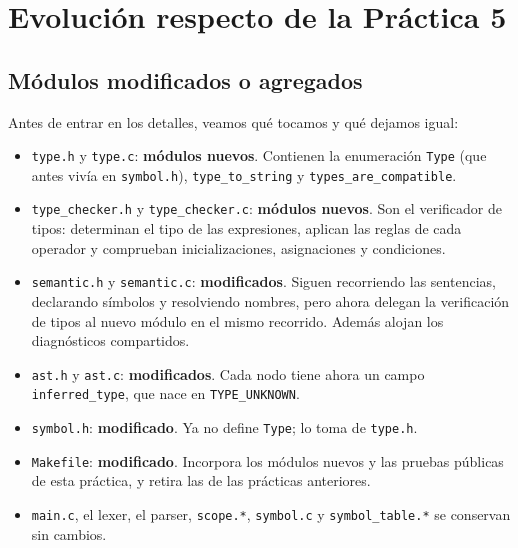 \documentclass[12pt,letterpaper]{article}
\begin{document}
\bigskip

\section*{Evolución respecto de la Práctica 5}

\subsection*{Módulos modificados o agregados}

Antes de entrar en los detalles, veamos qué tocamos y qué dejamos igual:

\begin{itemize}
\item \texttt{type.h} y \texttt{type.c}: \textbf{módulos nuevos}. Contienen la enumeración \texttt{Type} (que
  antes vivía en \texttt{symbol.h}), \texttt{type\_to\_string} y \texttt{types\_are\_compatible}.

\item \texttt{type\_checker.h} y \texttt{type\_checker.c}: \textbf{módulos nuevos}. Son el verificador de tipos:
  determinan el tipo de las expresiones, aplican las reglas de cada operador y comprueban inicializaciones,
  asignaciones y condiciones.

\item \texttt{semantic.h} y \texttt{semantic.c}: \textbf{modificados}. Siguen recorriendo las sentencias,
  declarando símbolos y resolviendo nombres, pero ahora delegan la verificación de tipos al nuevo módulo en el
  mismo recorrido. Además alojan los diagnósticos compartidos.

\item \texttt{ast.h} y \texttt{ast.c}: \textbf{modificados}. Cada nodo tiene ahora un campo
  \texttt{inferred\_type}, que nace en \texttt{TYPE\_UNKNOWN}.

\item \texttt{symbol.h}: \textbf{modificado}. Ya no define \texttt{Type}; lo toma de \texttt{type.h}.

\item \texttt{Makefile}: \textbf{modificado}. Incorpora los módulos nuevos y las pruebas públicas de esta
  práctica, y retira las de las prácticas anteriores.

\item \texttt{main.c}, el lexer, el parser, \texttt{scope.*}, \texttt{symbol.c} y \texttt{symbol\_table.*} se
  conservan sin cambios.
\end{itemize}
\end{document}
